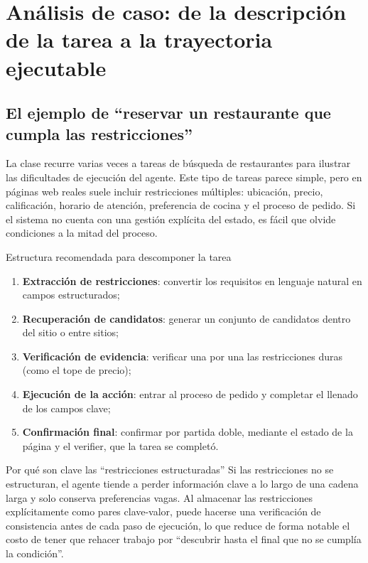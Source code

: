 \section{Análisis de caso: de la descripción de la tarea a la trayectoria ejecutable}

\subsection{El ejemplo de ``reservar un restaurante que cumpla las restricciones''}
La clase recurre varias veces a tareas de búsqueda de restaurantes para ilustrar las dificultades de ejecución del agente. Este tipo de tareas parece simple, pero en páginas web reales suele incluir restricciones múltiples: ubicación, precio, calificación, horario de atención, preferencia de cocina y el proceso de pedido. Si el sistema no cuenta con una gestión explícita del estado, es fácil que olvide condiciones a la mitad del proceso.

\begin{importantbox}{Estructura recomendada para descomponer la tarea}
\begin{enumerate}
    \item \textbf{Extracción de restricciones}: convertir los requisitos en lenguaje natural en campos estructurados;
    \item \textbf{Recuperación de candidatos}: generar un conjunto de candidatos dentro del sitio o entre sitios;
    \item \textbf{Verificación de evidencia}: verificar una por una las restricciones duras (como el tope de precio);
    \item \textbf{Ejecución de la acción}: entrar al proceso de pedido y completar el llenado de los campos clave;
    \item \textbf{Confirmación final}: confirmar por partida doble, mediante el estado de la página y el verifier, que la tarea se completó.
\end{enumerate}
\end{importantbox}

\begin{knowledgebox}{Por qué son clave las ``restricciones estructuradas''}
Si las restricciones no se estructuran, el agente tiende a perder información clave a lo largo de una cadena larga y solo conserva preferencias vagas. Al almacenar las restricciones explícitamente como pares clave-valor, puede hacerse una verificación de consistencia antes de cada paso de ejecución, lo que reduce de forma notable el costo de tener que rehacer trabajo por ``descubrir hasta el final que no se cumplía la condición''.
\end{knowledgebox}

